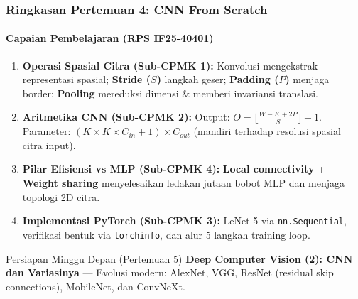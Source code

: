 \documentclass[t,aspectratio=169,xcolor=dvipsnames]{beamer}
\begin{document}
\begin{frame}
    \frametitle{Ringkasan Pertemuan 4: CNN From Scratch}
    \framesubtitle{Capaian Pembelajaran (RPS IF25-40401)}
    \footnotesize

    \begin{enumerate}
        \item \textbf{Operasi Spasial Citra (Sub-CPMK 1):} Konvolusi mengekstrak representasi spasial; \textbf{Stride ($S$)} langkah geser; \textbf{Padding ($P$)} menjaga border; \textbf{Pooling} mereduksi dimensi \& memberi invariansi translasi.
        \item \textbf{Aritmetika CNN (Sub-CPMK 2):} Output: $O = \lfloor\frac{W - K + 2P}{S}\rfloor + 1$. Parameter: $(K \times K \times C_{in} + 1) \times C_{out}$ (mandiri terhadap resolusi spasial citra input).
        \item \textbf{Pilar Efisiensi vs MLP (Sub-CPMK 4):} \textbf{Local connectivity} + \textbf{Weight sharing} menyelesaikan ledakan jutaan bobot MLP dan menjaga topologi 2D citra.
        \item \textbf{Implementasi PyTorch (Sub-CPMK 3):} LeNet-5 via \texttt{nn.Sequential}, verifikasi bentuk via \texttt{torchinfo}, dan alur 5 langkah training loop.
    \end{enumerate}

    \begin{block}{Persiapan Minggu Depan (Pertemuan 5)}
        \textbf{Deep Computer Vision (2): CNN dan Variasinya} --- Evolusi modern: AlexNet, VGG, ResNet (residual skip connections), MobileNet, dan ConvNeXt.
    \end{block}
\end{frame}

\end{document}
